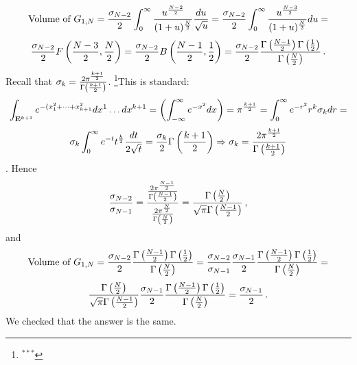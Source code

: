              $$
       \hbox {Volume of $G_{1,N}$}=
{\sigma_{N-2}\over 2}
                \int_0^{\infty} 
{u^{N-2\over 2}\over (1+u)^{N\over 2}}
           {du\over \sqrt u }=
{\sigma_{N-2}\over 2}
                \int_0^{\infty} 
{u^{N-3\over 2}\over (1+u)^{N\over 2}}du=
             $$
            $$
{\sigma_{N-2}\over 2}
             F\left({N-3\over 2},{N\over 2}\right)=
 {\sigma_{N-2}\over 2}
             B\left({N-1\over 2},{1\over 2}\right)=
 {\sigma_{N-2}\over 2}
          {\Gamma\left(N-1\over 2\right)
          \Gamma\left(1\over 2\right)\over
          \Gamma\left(N\over 2\right)}\,.
             $$
Recall that   
$\sigma_{k}={2\pi^{k+1\over 2} \over \Gamma\left(k+1\over 2\right)}$.
\footnote{$^{***}$}{This is standard:
         $$
\int_{{\bf E}^{k+1}} e^{-(x_1^2+\dots+x_{k+1}^2}dx^1\dots dx^{k+1}=
  \left(\int_{-\infty}^{\infty}e^{-x^2}dx\right)=
\pi^{k+1\over 2}=\int_0^\infty e^{-r^2}r^k\sigma_k dr=
                  $$
                  $$
  \sigma_k\int_0^\infty e^{-t}t^{k\over 2}{dt\over 2\sqrt t}=
{\sigma_k\over  2}\Gamma\left(k+1\over 2\right)
        \Rightarrow \sigma_k=
   {2\pi^{k+1\over 2}\over  \Gamma\left(k+1\over 2\right)}
                 $$
}.  Hence
                $$
{\sigma_{N-2}\over \sigma_{N-1}}=
                    {
{2\pi^{N-1\over 2} \over \Gamma\left(N-1\over 2\right)}
        \over
{2\pi^{N\over 2} \over \Gamma\left(N\over 2\right)}
           }=
        {
       \Gamma\left(N\over 2\right)
                  \over 
      \sqrt \pi \Gamma\left(N-1\over 2\right)
   }\,,
                   $$
and             $$
       \hbox {Volume of $G_{1,N}$}=
            {\sigma_{N-2}\over 2}
          {\Gamma\left(N-1\over 2\right)
          \Gamma\left(1\over 2\right)\over
          \Gamma\left(N\over 2\right)}
           =
            {\sigma_{N-2}\over \sigma_{N-1}}
            {\sigma_{N-1}\over 2}
          {\Gamma\left(N-1\over 2\right)
          \Gamma\left(1\over 2\right)\over
          \Gamma\left(N\over 2\right)}
             = $$
                $$
               {
       \Gamma\left(N\over 2\right)
                  \over 
      \sqrt \pi \Gamma\left(N-1\over 2\right)
                          }
 {\sigma_{N-1}\over 2}
          {\Gamma\left(N-1\over 2\right)
          \Gamma\left(1\over 2\right)\over
          \Gamma\left(N\over 2\right)}
        ={\sigma_{N-1}\over 2}\,.
             $$
We checked that the answer is the same.

\medskip

